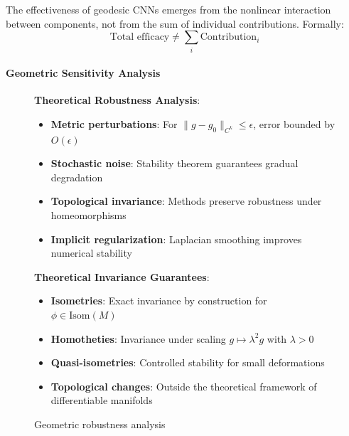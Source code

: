 \begin{remark}
The effectiveness of geodesic CNNs emerges from the nonlinear interaction between components, not from the sum of individual contributions. Formally:
\begin{equation}
\text{Total efficacy} \neq \sum_{i} \text{Contribution}_i
\end{equation}
\end{remark}

\paragraph{Geometric Sensitivity Analysis}

\begin{figure}[h]
\centering
\begin{minipage}{0.48\textwidth}
\textbf{Theoretical Robustness Analysis}:
\begin{itemize}
    \item \textbf{Metric perturbations}: For $\|g - g_0\|_{C^k} \leq \epsilon$, error bounded by $O(\epsilon)$
    \item \textbf{Stochastic noise}: Stability theorem guarantees gradual degradation
    \item \textbf{Topological invariance}: Methods preserve robustness under homeomorphisms
    \item \textbf{Implicit regularization}: Laplacian smoothing improves numerical stability
\end{itemize}
\end{minipage}
\hfill
\begin{minipage}{0.48\textwidth}
\textbf{Theoretical Invariance Guarantees}:
\begin{itemize}
    \item \textbf{Isometries}: Exact invariance by construction for $\phi \in \text{Isom}(M)$
    \item \textbf{Homotheties}: Invariance under scaling $g \mapsto \lambda^2 g$ with $\lambda > 0$
    \item \textbf{Quasi-isometries}: Controlled stability for small deformations
    \item \textbf{Topological changes}: Outside the theoretical framework of differentiable manifolds
\end{itemize}
\end{minipage}
\caption[Geometric robustness analysis]{Geometric robustness analysis}
\label{fig:geometric_robustness}
\end{figure}

